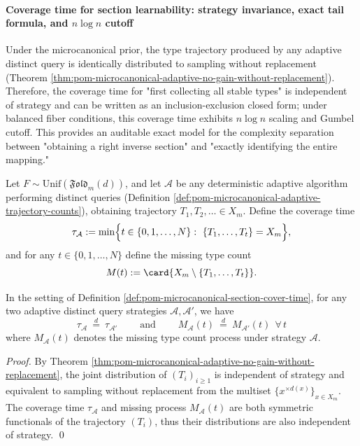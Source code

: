 \paragraph{Coverage time for section learnability: strategy invariance, exact tail formula, and \texorpdfstring{$n\log n$}{n log n} cutoff}
Under the microcanonical prior, the type trajectory produced by any adaptive distinct query is identically distributed to sampling without replacement (Theorem \ref{thm:pom-microcanonical-adaptive-no-gain-without-replacement}).
Therefore, the coverage time for "first collecting all stable types" is independent of strategy and can be written as an inclusion-exclusion closed form;
under balanced fiber conditions, this coverage time exhibits \(n\log n\) scaling and Gumbel cutoff.
This provides an auditable exact model for the complexity separation between "obtaining a right inverse section" and "exactly identifying the entire mapping."

\begin{definition}\label{def:pom-microcanonical-section-cover-time}
Let \(F\sim\mathrm{Unif}(\mathfrak{Fold}_m(d))\), and let \(\mathcal{A}\) be any deterministic adaptive algorithm performing distinct queries (Definition \ref{def:pom-microcanonical-adaptive-trajectory-counts}), obtaining trajectory \(T_1,T_2,\dots\in X_m\).
Define the coverage time
\[
\tau_{\mathcal A}:=\min\Bigl\{t\in\{0,1,\dots,N\}:\ \{T_1,\dots,T_t\}=X_m\Bigr\},
\]
and for any \(t\in\{0,1,\dots,N\}\) define the missing type count
\[
M(t):=\card{X_m\setminus\{T_1,\dots,T_t\}}.
\]
\end{definition}

\begin{theorem}\label{thm:pom-microcanonical-cover-time-strategy-invariance}
In the setting of Definition \ref{def:pom-microcanonical-section-cover-time}, for any two adaptive distinct query strategies \(\mathcal{A},\mathcal{A}'\), we have
\[
\boxed{\;
\tau_{\mathcal A}\ \stackrel{d}{=}\ \tau_{\mathcal A'}\;}
\qquad\text{and}\qquad
\boxed{\;
M_{\mathcal A}(t)\ \stackrel{d}{=}\ M_{\mathcal A'}(t)\ \ \forall\,t\;}
\]
where \(M_{\mathcal A}(t)\) denotes the missing type count process under strategy \(\mathcal A\).
\end{theorem}
\begin{proof}
By Theorem \ref{thm:pom-microcanonical-adaptive-no-gain-without-replacement},
the joint distribution of \((T_i)_{i\ge 1}\) is independent of strategy and equivalent to sampling without replacement from the multiset \(\{x^{\times d(x)}\}_{x\in X_m}\).
The coverage time \(\tau_{\mathcal A}\) and missing process \(M_{\mathcal A}(t)\) are both symmetric functionals of the trajectory \((T_i)\),
thus their distributions are also independent of strategy. \qed
\end{proof}

